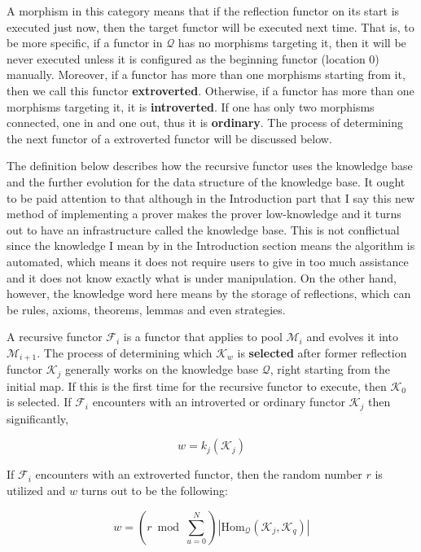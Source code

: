 \documentclass{article}
\begin{document}
A morphism in this category means that if the reflection functor on its start is executed just now, then the target functor will be executed next time. That is, to be more specific, if a functor in \(\mathcal{Q}\) has no morphisms targeting it, then it will be never executed unless it is configured as the beginning functor (location \(0\)) manually. Moreover, if a functor has more than one morphisms starting from it, then we call this functor \textbf{ extroverted}. Otherwise, if a functor has more than one morphisms targeting it, it is \textbf{ introverted}. If one has only two morphisms connected, one in and one out, thus it is\textbf{  ordinary}. The process of determining the next functor of a extroverted functor will be discussed below.

The definition below describes how the recursive functor uses the knowledge base and the further evolution for the data structure of the knowledge base. It ought to be paid attention to that although in the Introduction part that I say this new method of implementing a prover makes the prover low-knowledge and it turns out to have an infrastructure called the knowledge base. This is not conflictual since the knowledge I mean by in the Introduction section means the algorithm is automated, which means it does not require users to give in too much assistance and it does not know exactly what is under manipulation. On the other hand, however, the knowledge word here means by the storage of reflections, which can be rules, axioms, theorems, lemmas and even strategies.

A recursive functor \(\mathcal{F}_i\) is a functor that applies to pool \(\mathcal{M}_i\) and evolves it into \(\mathcal{M}_{i+1}\). The process of determining which \(\mathcal{K}_w\) is \textbf{ selected} after former reflection functor \(\mathcal{K}_j\) generally works on the knowledge base \(\mathcal{Q}\), right starting from the initial map. If this is the first time for the recursive functor to execute, then \(\mathcal{K}_0\) is selected. If \(\mathcal{F}_i\) encounters with an introverted or ordinary functor \(\mathcal{K}_j\) then significantly,

\[w = k_j\left(\mathcal{K}_j\right)\]

If \(\mathcal{F}_i\) encounters with an extroverted functor, then the random number \(\mathit{r}\) is utilized and \(w\) turns out to be the following:

\[w = (\mathit{r} \bmod \sum _{u=0}^N )\left|\text{Hom}_{\mathcal{Q}}\left(\mathcal{K}_j,\mathcal{K}_q\right)\right|\]
\end{document}
